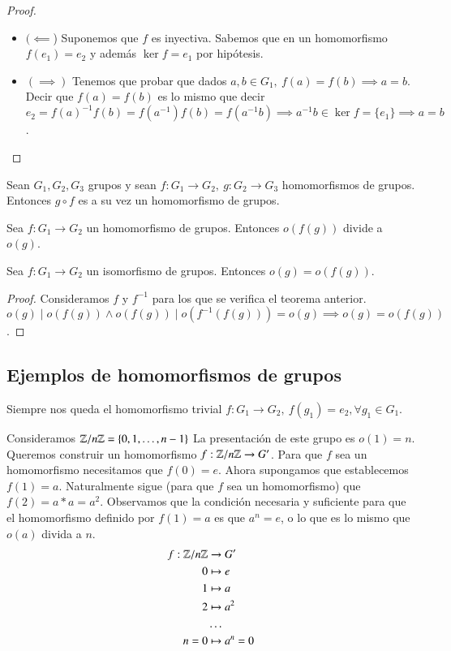 \begin{proof}$ $ \newline
	\begin{itemize}
		\item $(\impliedby$) Suponemos que $f$ es inyectiva. Sabemos que en un homomorfismo $f(e_1) = e_2$ y además $\ker f = {e_1}$ por hipótesis.
		\item $(\implies)$ Tenemos que probar que dados $a,b \in G_1,\ f(a) = f(b) \implies a = b$. Decir que $f(a) = f(b)$ es lo mismo que decir $e_2 = f(a)^{-1}f(b) = f(a^{-1}) f(b) = f(a^{-1}b) \implies a^{-1}b \in \ker f = \{e_1\} \implies a = b$.
	\end{itemize}
\end{proof}

\begin{pro}
	Sean $G_1, G_2, G_3$ grupos y sean $f:G_1 \to G_2,\ g:G_2 \to G_3$ homomorfismos de grupos. Entonces $g \circ f$ es a su vez un homomorfismo de grupos.
\end{pro}

\begin{thm}
	Sea $f:G_1 \to G_2$ un homomorfismo de grupos. Entonces $o(f(g))$ divide a $o(g)$.
\end{thm}

\begin{thm}
	Sea $f:G_1 \to G_2$ un isomorfismo de grupos. Entonces $o(g) = o(f(g))$.
\end{thm}

\begin{proof}
	Consideramos $f$ y $f^{-1}$ para los que se verifica el teorema anterior. $o(g) \mid o(f(g)) \land o(f(g)) \mid o(f^{-1}(f(g))) = o(g) \implies o(g) = o(f(g))$. 
\end{proof}

\subsection{Ejemplos de homomorfismos de grupos}

\begin{ej}Siempre nos queda el homomorfismo trivial $f:G_1 \to G_2,\ f(g_1) = e_2, \forall g_1 \in G_1$.
\end{ej}

\begin{ej}
	Consideramos $\mathbb{Z}/n\mathbb{Z} = \{0, 1, \dots, n-1\}$ La presentación de este grupo es $o(1) = n$. Queremos construir un homomorfismo $f:\mathbb{Z}/n\mathbb{Z} \to G'$. Para que $f$ sea un homomorfismo necesitamos que $f(0) = e$. Ahora supongamos que establecemos $f(1) = a$. Naturalmente sigue (para que $f$ sea un homomorfismo) que $f(2) = a\ast a = a^2$. Observamos que la condición necesaria y suficiente para que el homomorfismo definido por $f(1) = a$ es que $a^n = e$, o lo que es lo mismo que $o(a)$ divida a $n$.
	\begin{align*}
	f:\mathbb{Z}/n\mathbb{Z} &\to G' \\
	0 &\mapsto e \\
	1 &\mapsto a \\
	2 &\mapsto a^2\\
	&\dots \\
	n = 0 &\mapsto a^n = 0
	\end{align*}
\end{ej}

